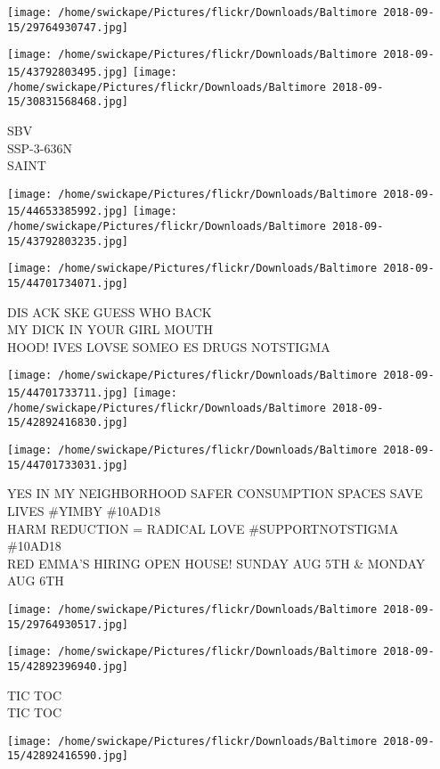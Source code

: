 \documentclass[10pt,letterpaper]{article}
\begin{document}
\texttt{[image: /home/swickape/Pictures/flickr/Downloads/Baltimore 2018-09-15/29764930747.jpg]}

\vspace{0.25in}
\texttt{[image: /home/swickape/Pictures/flickr/Downloads/Baltimore 2018-09-15/43792803495.jpg]}
\texttt{[image: /home/swickape/Pictures/flickr/Downloads/Baltimore 2018-09-15/30831568468.jpg]}

SBV\\
SSP{-}3{-}636N\\
SAINT
\pagebreak

\texttt{[image: /home/swickape/Pictures/flickr/Downloads/Baltimore 2018-09-15/44653385992.jpg]}
\texttt{[image: /home/swickape/Pictures/flickr/Downloads/Baltimore 2018-09-15/43792803235.jpg]}

\vspace{0.25in}
\texttt{[image: /home/swickape/Pictures/flickr/Downloads/Baltimore 2018-09-15/44701734071.jpg]}

DIS ACK SKE GUESS WHO BACK\\
MY DICK IN YOUR GIRL MOUTH\\
HOOD!  IVES LOVSE SOMEO ES DRUGS NOTSTIGMA
\pagebreak

\texttt{[image: /home/swickape/Pictures/flickr/Downloads/Baltimore 2018-09-15/44701733711.jpg]}
\texttt{[image: /home/swickape/Pictures/flickr/Downloads/Baltimore 2018-09-15/42892416830.jpg]}

\texttt{[image: /home/swickape/Pictures/flickr/Downloads/Baltimore 2018-09-15/44701733031.jpg]}

YES IN MY NEIGHBORHOOD SAFER CONSUMPTION SPACES SAVE LIVES \#YIMBY \#10AD18\\
HARM REDUCTION = RADICAL LOVE \#SUPPORTNOTSTIGMA \#10AD18\\
RED EMMA'S HIRING OPEN HOUSE!   SUNDAY AUG 5TH \& MONDAY AUG 6TH
\pagebreak

\texttt{[image: /home/swickape/Pictures/flickr/Downloads/Baltimore 2018-09-15/29764930517.jpg]}

\vspace{0.25in}
\texttt{[image: /home/swickape/Pictures/flickr/Downloads/Baltimore 2018-09-15/42892396940.jpg]}

TIC TOC\\
TIC TOC
\pagebreak

\texttt{[image: /home/swickape/Pictures/flickr/Downloads/Baltimore 2018-09-15/42892416590.jpg]}
\end{document}
